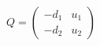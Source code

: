 \begin{equation}
Q= \left(
\begin{array}{cc}
-d_1 & u_1 \\
-d_2 & u_2 
\end{array}  \right)
\end{equation}

